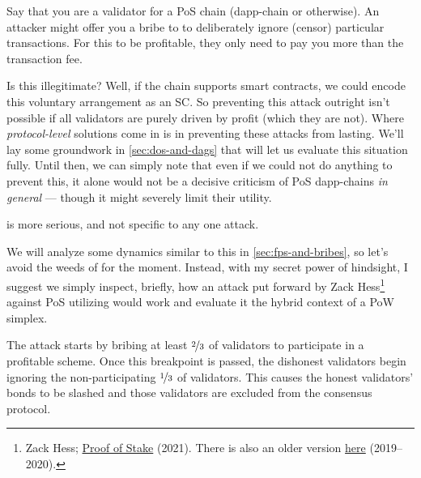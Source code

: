Say that you are a validator for a PoS chain (dapp-chain or otherwise).
An attacker might offer you a bribe to to deliberately ignore (censor) particular transactions.
For this to be profitable, they only need to pay you more than the transaction fee.

Is this illegitimate?
Well, if the chain supports smart contracts, we could encode this voluntary arrangement as an SC.
So preventing this attack outright isn't possible if all validators are purely driven by profit (which they are not).
Where \emph{protocol-level} solutions come in is in preventing these attacks from lasting.
We'll lay some groundwork in \autoref{sec:dos-and-dags} that will let us evaluate this situation fully.
Until then, we can simply note that even if we could not do anything to prevent this, it alone would not be a decisive criticism of PoS dapp-chains \emph{in general} --- though it might severely limit their utility.


\label{sec:ppe-problem-1}

\ThePpeProblem is more serious, and not specific to any one attack.

We will analyze some dynamics similar to this in \autoref{sec:fps-and-bribes}, so let's avoid the weeds of \ppe for the moment.
Instead, with my secret power of hindsight, I suggest we simply inspect, briefly, how an attack put forward by Zack Hess\footnote{
    Zack Hess; \href{\linkZackPoSCriticisms}{Proof of Stake} (2021).
    There is also an older version \href{https://github.com/zack-bitcoin/amoveo/blob/master/docs/other_blockchains/proof_of_stake.md}{here} (2019--2020).
} against PoS utilizing \ppe would work and evaluate it the hybrid context of a PoW simplex.

The attack starts by bribing at least $\nicefrac{2}{3}$ of validators to participate in a profitable scheme.
Once this breakpoint is passed, the dishonest validators begin ignoring the non-participating $\nicefrac{1}{3}$ of validators.
This causes the honest validators' bonds to be slashed and those validators are excluded from the consensus protocol.

